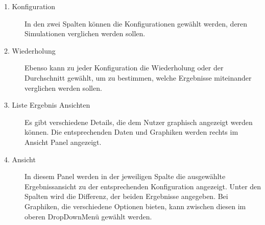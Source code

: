 \begin{description}

\item[1. Konfiguration] In den zwei Spalten können die Konfigurationen gewählt werden, deren Simulationen verglichen werden sollen.

\item[2. Wiederholung] Ebenso kann zu jeder Konfiguration die Wiederholung oder der Durchschnitt gewählt, um zu bestimmen, welche Ergebnisse miteinander verglichen werden sollen.

\item[3. Liste Ergebnis Ansichten] Es gibt verschiedene Details, die dem Nutzer graphisch angezeigt werden können. Die entsprechenden Daten und Graphiken werden rechts im Ansicht Panel angezeigt.


\item[4. Ansicht] In diesem Panel werden in der jeweiligen Spalte die ausgewählte Ergebnissansicht zu der entsprechenden Konfiguration angezeigt. Unter den Spalten wird die Differenz, der beiden Ergebnisse angegeben. Bei Graphiken, die verschiedene Optionen bieten, kann zwischen diesen im oberen DropDownMenü gewählt werden.

\end{description}



